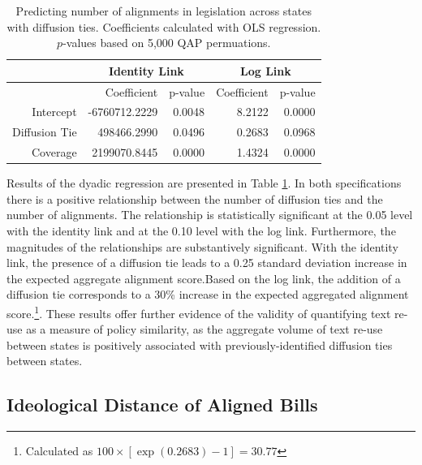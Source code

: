 \documentclass[12pt]{article} %
\begin{document}
\begin{table}[ht]
\centering
\begin{tabular}{rrrrr}
\hline
& \multicolumn{2}{c}{Identity Link} & \multicolumn{2}{c}{Log Link} \\
  \hline
 & Coefficient & p-value & Coefficient & p-value \\ 
  \hline
Intercept & -6760712.2229 & 0.0048 & 8.2122 & 0.0000 \\ 
  Diffusion Tie & 498466.2990 & 0.0496 & 0.2683 & 0.0968 \\ 
  Coverage & 2199070.8445 & 0.0000 & 1.4324 & 0.0000 \\ 
   \hline
\end{tabular}
\caption{Predicting number of alignments in legislation across states with diffusion ties. Coefficients calculated with OLS regression. $p$-values based on 5,000 QAP permuations.}
\label{tab:qap.diffusion}
\end{table}

Results of the dyadic regression are presented in Table \ref{tab:qap.diffusion}. In both specifications there is a positive relationship between the number of diffusion ties and the number of alignments. The relationship is statistically significant at the 0.05 level with the identity link and at the 0.10 level with the log link. Furthermore, the magnitudes of the relationships are substantively significant. With the identity link, the presence of a diffusion tie leads to a 0.25 standard deviation increase in the expected aggregate alignment score.Based on the log link, the addition of a diffusion tie corresponds to a 30\% increase in the expected aggregated alignment score.\footnote{Calculated as $100\times \left[ \exp(0.2683)-1\right] = 30.77$}. These results offer further evidence of the validity of quantifying text re-use as a measure of policy similarity, as the aggregate volume of text re-use between states is positively associated with previously-identified diffusion ties between states.


\subsection{Ideological Distance of Aligned Bills}
\end{document}
